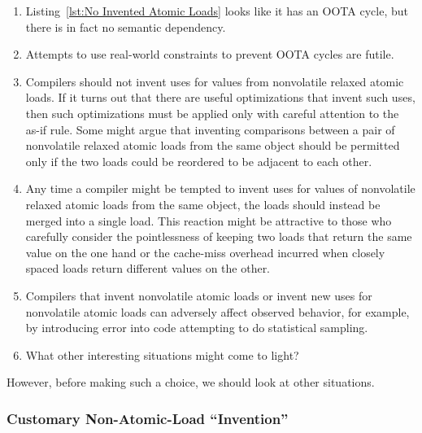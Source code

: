 \documentclass[10]{article}
\begin{document}
\begin{enumerate}
\item	Listing~\ref{lst:No Invented Atomic Loads}
	looks like it has an OOTA cycle, but there is in fact no
	semantic dependency.
\item	Attempts to use real-world constraints to prevent OOTA cycles
	are futile.
\item	Compilers should not invent uses for values from
	nonvolatile relaxed atomic loads.
	If it turns out that there are useful optimizations that invent
	such uses, then such optimizations must be applied only with
	careful attention to the as-if rule.
	Some might argue that inventing comparisons between a pair of
	nonvolatile relaxed atomic loads from the same object should
	be permitted only if the two loads could be reordered to be
	adjacent to each other.
\item	Any time a compiler might be tempted to invent uses for
	values of nonvolatile relaxed atomic loads from the same
	object, the loads should instead be merged into a single load.
	This reaction might be attractive to those who carefully consider
	the pointlessness of keeping two loads that return the same value
	on the one hand or the cache-miss overhead incurred when closely
	spaced loads return different values on the other.
\item	Compilers that invent nonvolatile atomic loads or invent
	new uses for nonvolatile atomic loads can adversely affect
	observed behavior, for example, by introducing error into code
	attempting to do statistical sampling.
\item	What other interesting situations might come to light?
\end{enumerate}

However, before making such a choice, we should look at other situations.

\subsubsection{Customary Non-Atomic-Load ``Invention''}
\label{app:Customary Non-Atomic-Load Invention}
\end{document}
